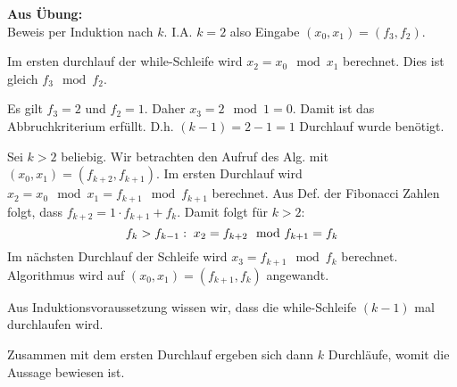 \textbf{Aus Übung:}\\

Beweis per Induktion nach $k$. I.A. $k=2$ also Eingabe $(x_0, x_1) = (f_3, f_2)$.

Im ersten durchlauf der while-Schleife wird $x_2 = x_0 \mod x_1$ berechnet. Dies ist gleich $f_3  \mod f_2$.

Es gilt $f_3 = 2$ und $f_2 = 1$. Daher $x_3 = 2 \mod 1=0$. Damit ist das Abbruchkriterium erfüllt. D.h. $(k-1) = 2-1 = 1$ Durchlauf wurde benötigt.

Sei $k>2$ beliebig. Wir betrachten den Aufruf des Alg. mit $(x_0, x_1) = (f_{k+2}, f_{k+1})$. Im ersten Durchlauf wird $x_2 = x_0 \mod x_1= f_{k+1} \mod f_{k+1}$ berechnet. Aus Def. der Fibonacci Zahlen folgt, dass $f_{k+2} = 1 \cdot f_{k+1} + f_k$. Damit folgt für $k>2$:
\[
   f_{k}>f_{k-1}: \; x_2 = f_{k+2} \mod f_{k+1} = f_k \\
 \]
 Im nächsten Durchlauf der Schleife wird $x_3 = f_{k+1} \mod f_k $ berechnet. Algorithmus wird auf $(x_0, x_1) = (f_{k+1}, f_k)$ angewandt.

 Aus Induktionsvoraussetzung wissen wir, dass die while-Schleife $(k-1)$ mal durchlaufen wird.

 Zusammen mit dem ersten Durchlauf ergeben sich dann $k$ Durchläufe, womit die Aussage bewiesen ist.